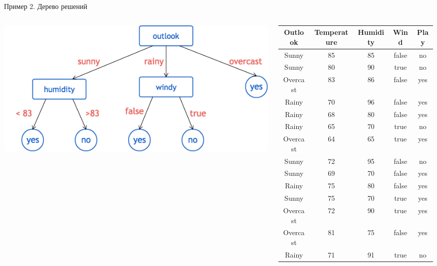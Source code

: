\documentclass[aspectratio=169]{beamer}
\begin{document}
\begin{frame}{Пример 2. Дерево решений}
    
\begin{columns}
\begin{column}{.5\textwidth}
\begin{center}
\includegraphics[width=\textwidth]{images/dtree.png}
\end{center}
\end{column}
%   
\begin{column}{.5\textwidth}
\begin{tiny}
\begin{center}
\begin{tabular}{c | c | c | c | c }
\bf Outlook & \bf Temperature & \bf Humidity & \bf Wind & \bf Play \\
\hline
Sunny & 85 & 85 & false & no \\
Sunny & 80 & 90 & true & no \\
Overcast & 83 & 86 & false & yes \\
Rainy & 70 & 96 & false & yes \\
Rainy & 68 & 80 & false & yes \\
Rainy & 65 & 70 & true & no \\
Overcast & 64 & 65 & true & yes \\
Sunny & 72 & 95 & false & no \\
Sunny & 69 & 70 & false & yes \\
Rainy & 75 & 80 & false & yes \\
Sunny & 75 & 70 & true & yes \\
Overcast & 72 & 90 & true & yes \\
Overcast & 81 & 75 & false & yes \\
Rainy & 71 & 91 & true & no \\
\end{tabular}
\end{center}
\end{tiny}
\end{column}
\end{columns}

\end{frame}
\end{document}
